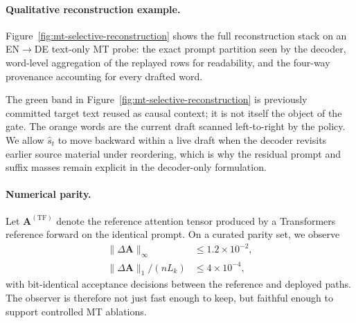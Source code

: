 \documentclass[11pt]{article}
\begin{document}
\paragraph{Qualitative reconstruction example.}
Figure~\ref{fig:mt-selective-reconstruction} shows the full reconstruction
stack on an EN$\to$DE text-only MT probe: the exact prompt partition seen by
the decoder, word-level aggregation of the replayed rows for readability, and
the four-way provenance accounting for every drafted word.



The green band in Figure~\ref{fig:mt-selective-reconstruction} is previously
committed target text reused as causal context; it is not itself the object of
the gate. The orange words are the current draft scanned left-to-right by the
policy. We allow $\hat{s}_t$ to move backward within a live draft when the
decoder revisits earlier source material under reordering, which is why the
residual prompt and suffix masses remain explicit in the decoder-only
formulation.

\paragraph{Numerical parity.}
Let $\mathbf{A}^{(\mathrm{TF})}$ denote the reference attention tensor produced
by a Transformers reference forward on the identical prompt. On a curated
parity set, we observe
\begin{equation}
  \begin{aligned}
    \|\Delta\mathbf{A}\|_\infty &\leq 1.2 \times 10^{-2}, \\
    \|\Delta\mathbf{A}\|_1 / (nL_k) &\leq 4 \times 10^{-4},
  \end{aligned}
  \label{eq:parity}
\end{equation}
with bit-identical acceptance decisions between the reference and deployed paths.
The observer is therefore not just fast enough to keep, but faithful enough to
support controlled MT ablations.
\end{document}
